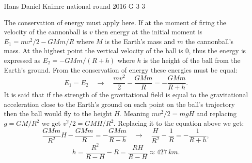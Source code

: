 \documentclass[11pt]{article}
\begin{document}
{Hans Daniel Kaimre} %
{national round} %
{2016} %
{G 3} %
{3} %
{

\ifEngSolution
The conservation of energy must apply here. If at the moment of firing the velocity of the cannonball is $v$ then energy at the initial moment is $E_1 = mv^2/2 - GMm/R$ where $M$ is the Earth’s mass and $m$ the cannonball’s mass. At the highest point the vertical velocity of the ball is 0, thus the energy is expressed as $E_2 = -GMm/(R+h)$ where $h$ is the height of the ball from the Earth’s ground. From the conservation of energy these energies must be equal:
$$E_1 = E_2 \quad\rightarrow\quad \frac{mv^2}{2} - \frac{GMm}{R} = -\frac{GMm}{R+h}.$$
It is said that if the strength of the gravitational field is equal to the gravitational acceleration close to the Earth’s ground on each point on the ball’s trajectory then the ball would fly to the height $H$. Meaning $mv^2/2=mgH$ and replacing $g=GM/R^2$ we get $v^2/2=GMH/R^2$. Replacing it to the equation above we get:
$$\frac{GMm}{R^2}H - \frac{GMm}{R} = -\frac{GMm}{R+h} \quad\rightarrow\quad \frac{H}{R^2}-\frac{1}{R} = - \frac{1}{R+h},$$
$$h=\frac{R^2}{R-H} - R = \frac{RH}{R-H} \approx \SI{427}{km}.$$
\fi
}
\end{document}
